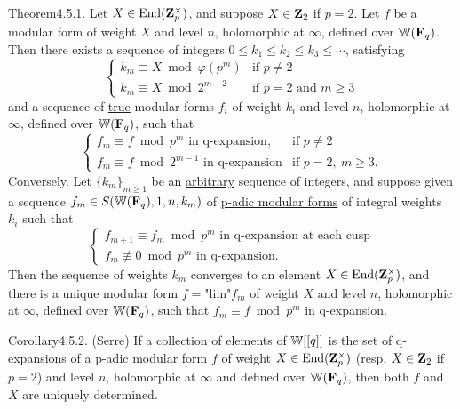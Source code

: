 \begin{kathm}{Theorem}{4.5.1.}
Let $X\in\operatorname{End}(\mathbf{Z}_p^\times)$, and suppose $X\in\mathbf{Z}_2$ if $p=2$. Let $f$ be a
modular form of weight $X$ and level $n$, holomorphic at $\infty$, defined over
$\mathbb{W}(\mathbf{F}_q)$. Then there exists a sequence of integers $0\leq k_1\leq k_2\leq
k_3\leq\cdots$, satisfying
\[
\begin{cases}
k_m\equiv X \bmod \varphi(p^m) & \text{if } p\neq 2 \\
k_m\equiv X \bmod 2^{m-2} & \text{if } p=2 \text{ and } m\geq 3
\end{cases}
\]
and a sequence of \uline{true} modular forms $f_i$ of weight $k_i$ and level $n$,
holomorphic at $\infty$, defined over $\mathbb{W}(\mathbf{F}_q)$, such that
\[
\begin{cases}
f_m\equiv f \bmod p^m \text{ in q-expansion}, & \text{if } p\neq 2 \\
f_m\equiv f \bmod 2^{m-1} \text{ in q-expansion} & \text{if } p=2,\ m\geq 3 .
\end{cases}
\]
Conversely. Let $\{k_m\}_{m\geq 1}$ be an \uline{arbitrary} sequence of integers,
and suppose given a sequence $f_m\in S(\mathbb{W}(\mathbf{F}_q),1,n,k_m)$ of \uline{p-adic
modular forms} of integral weights $k_i$ such that
\[
\begin{cases}
f_{m+1}\equiv f_m \bmod p^m \text{ in q-expansion at each cusp} \\
f_m\not\equiv 0 \bmod p^m \text{ in q-expansion.}
\end{cases}
\]
Then the sequence of weights $k_m$ converges to an element
$X\in\operatorname{End}(\mathbf{Z}_p^\times)$, and there is a unique modular form $f=\text{"lim"}f_m$
of weight $X$ and level $n$, holomorphic at $\infty$, defined over $\mathbb{W}(\mathbf{F}_q)$,
such that $f_m\equiv f \bmod p^m$ in q-expansion.
\end{kathm}

\begin{kathm}{Corollary}{4.5.2.}
(Serre) If a collection of elements of $\mathbb{W}[[q]]$ is the set of q-expansions of a
p-adic modular form $f$ of weight $X\in\operatorname{End}(\mathbf{Z}_p^\times)$ (resp. $X\in\mathbf{Z}_2$ if
$p=2$) and level $n$, holomorphic at $\infty$ and defined over $\mathbb{W}(\mathbf{F}_q)$, then
both $f$ and $X$ are uniquely determined.
\end{kathm}


